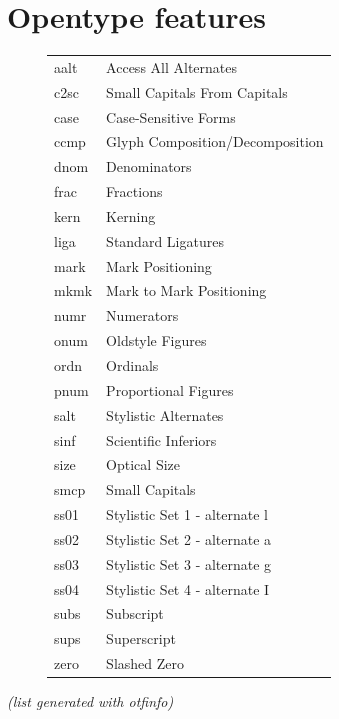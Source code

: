 \documentclass[10pt,a4paper,english]{article}
\begin{document}
\newpage
\section{Opentype features}
\label{sec:otfinfo}

\begin{figure}[ht]
	\centering
	\begin{tabular}{>{\ttfamily}l l}
		aalt & Access All Alternates \\
		c2sc & Small Capitals From Capitals \\
		case & Case-Sensitive Forms \\
		ccmp & Glyph Composition/Decomposition \\
		dnom & Denominators \\
		frac & Fractions \\
		kern & Kerning \\
		liga & Standard Ligatures \\
		mark & Mark Positioning \\
		mkmk & Mark to Mark Positioning \\
		numr & Numerators \\
		onum & Oldstyle Figures \\
		ordn & Ordinals \\
		pnum & Proportional Figures \\
		salt & Stylistic Alternates \\
		sinf & Scientific Inferiors \\
		size & Optical Size \\
		smcp & Small Capitals \\
		ss01 & Stylistic Set 1 - alternate l \\
		ss02 & Stylistic Set 2 - alternate a \\
		ss03 & Stylistic Set 3 - alternate g \\
		ss04 & Stylistic Set 4 - alternate I \\
		subs & Subscript \\
		sups & Superscript \\
		zero & Slashed Zero
	\end{tabular}
\end{figure}
\textit{(list generated with otfinfo)}
\end{document}
